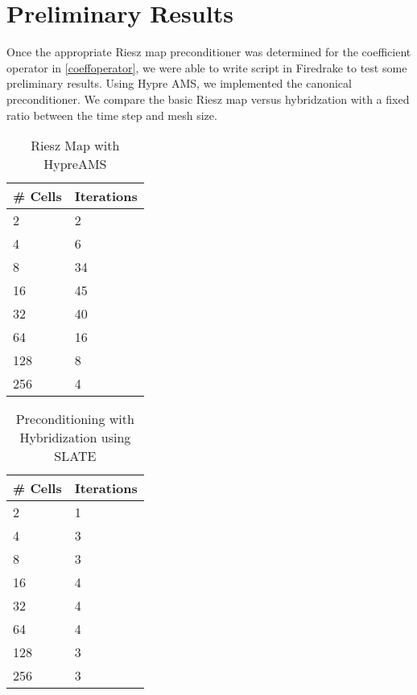 \documentclass[11pt]{article}
\begin{document}
\section{Preliminary Results}
Once the appropriate Riesz map preconditioner was determined for the coefficient operator in \eqref{coeffoperator}, we were able to write script in Firedrake to test some preliminary results. Using Hypre AMS, we implemented the canonical preconditioner. We compare the basic Riesz map versus hybridzation with a fixed ratio between the time step and mesh size.
\newpage
\begin{table}[h!]
	\begin{center}
		\caption{Riesz Map with HypreAMS}
		\label{tab:table1}
		\begin{tabular}{l|l}
			\toprule 
			\textbf{\# Cells} & \textbf{Iterations}\\
			\midrule 
			2 & 2 \\
			4 & 6 \\
			8 &34 \\
			16 & 45 \\
			32 & 40 \\
			64 & 16 \\
			128 & 8 \\
			256 & 4 \\
			\bottomrule 
		\end{tabular}
	\end{center}
\end{table}

\begin{table}[h!]
	\begin{center}
		\caption{Preconditioning with Hybridization using SLATE}
		\label{tab:table1}
		\begin{tabular}{l|l}
			\toprule 
			\textbf{\# Cells} & \textbf{Iterations}\\
			\midrule 
			2 & 1 \\
			4 & 3 \\
			8 & 3 \\
			16 & 4 \\
			32 & 4 \\
			64 & 4 \\
			128 & 3 \\
 			256 & 3 \\
			\bottomrule
		\end{tabular}
	\end{center}
\end{table}
\end{document}
